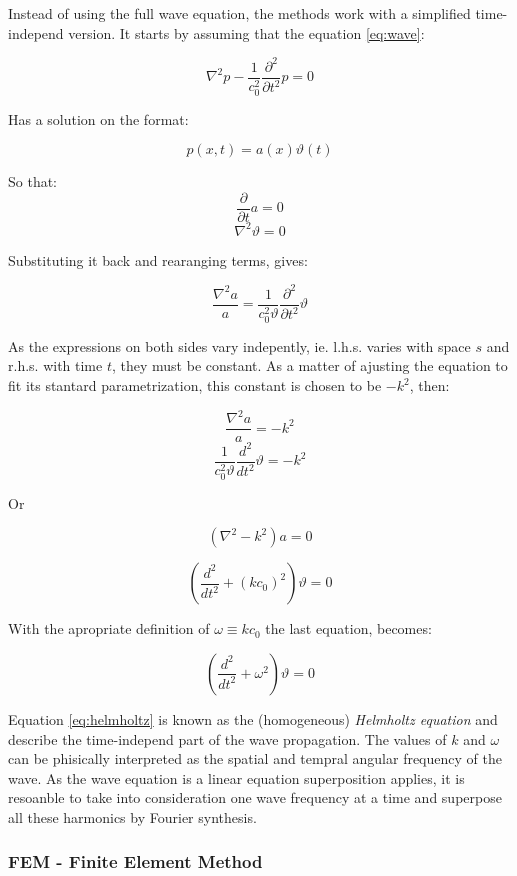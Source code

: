 Instead of using the full wave equation, the methods work with a simplified
time-independ version. It starts by assuming that the equation
\ref{eq:wave}:

\[ \nabla^2 p - \frac{1}{c^2_0}\frac{\partial^2}{\partial t^2} p = 0 \]

Has a solution on the format:

\[ p(x,t) = a(x)\vartheta(t) \]

So that:
\[ \frac{\partial}{\partial t}a = 0 \]
\[ \nabla^2 \vartheta = 0 \]

Substituting it back and rearanging terms, gives:

\[ \frac{\nabla^2 a}{a} = \frac{1}{c_0^2\vartheta} \frac{\partial^2}{\partial
t^2}\vartheta  \]

As the expressions on both sides vary indepently, ie. l.h.s. varies with space
$s$ and r.h.s. with time $t$, they must be constant. As a matter of ajusting the
equation to fit its stantard parametrization, this constant is chosen to be
$-k^2$, then:

\[ \frac{\nabla^2 a}{a} = -k^2  \]
\[ \frac{1}{c_0^2\vartheta} \frac{d^2}{dt^2}\vartheta = -k^2  \]

Or

\begin{equation}
\label{eq:helmholtz}
(\nabla^2 -k^2)a = 0 
\end{equation}

\[ (\frac{d^2}{dt^2} + (kc_0)^2)\vartheta = 0  \]

With the apropriate definition of $\omega \equiv kc_0 $ the last equation,
becomes:

\begin{equation}
(\frac{d^2}{dt^2} + \omega^2)\vartheta = 0
\end{equation}

Equation \ref{eq:helmholtz} is known as the (homogeneous) \textit{Helmholtz
equation} and describe the time-independ part of the wave propagation. The
values of $k$ and $\omega$ can be phisically interpreted as the spatial and
tempral angular frequency of the wave. As the wave equation is a linear
equation superposition applies, it is resoanble to take into consideration
one wave frequency at a time and superpose all these harmonics by Fourier
synthesis\cite{Lefebvre}.



\subsubsection{FEM - Finite Element Method}\cite{funkhouser2003survey}
